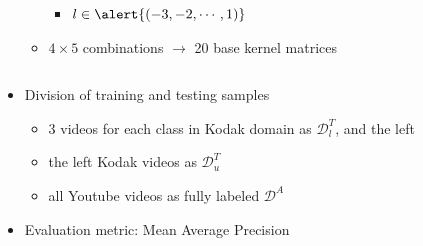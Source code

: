 \begin{frame}
\begin{itemize}
\begin{columns}
\begin{itemize}
\begin{itemize}
								\item $l \in \alert{(-3, -2,\cdots, 1)}$
							\end{itemize}
						
						\item \alert{$4 \times 5$} combinations $\rightarrow$ 20 base kernel matrices
					\end{itemize}
			\end{columns}

		\item Division of training and testing samples
			\begin{itemize}
				\item 3 videos for each class in Kodak domain as $\mathcal{D}_l^T$, and the left 

				\item the left Kodak videos as $\mathcal{D}_u^T$

				\item all Youtube videos as fully labeled $\mathcal{D}^A$ 
			\end{itemize}

		\item Evaluation metric: Mean Average Precision
			


	\end{itemize}	
\end{frame}

